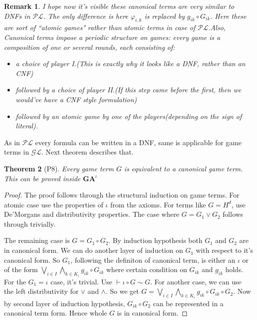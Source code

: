 \documentclass[10pt]{article}
\renewcommand{\phi}{\varphi}
\newcommand{\pl}{\mathcal{PL}}
\newcommand{\gl}{\mathcal{GL}}
\newcommand{\id}{\iota}
\newcommand{\com}[2]{#1 \circ #2 }
\newtheorem{theorem}{Theorem}
\newtheorem{remark}[theorem]{Remark}
\begin{document}
	\begin{remark}
		I hope now it's visible these canonical terms are very similar to DNFs in $\pl$. The only difference is here $\phi_{i,k}$ is replaced by $\com{g_{ik}}{G_{ik}}$. Here these are sort of ``atomic games" rather than atomic terms in case of $\pl$.Also, Canonical terms impose a periodic  structure on games: every game is a composition of one or several rounds, each consisting of:
		\begin{itemize}
			\item a choice of player I.(This is exactly why it looks like a DNF, rather than an CNF)
			\item followed by a choice of player II.(If this step came before the first, then we would've have a CNF style formulation)
			\item followed by an atomic game by one of the players(depending on the sign of literal).
		\end{itemize}
	\end{remark}
	As in $\pl$ every formula can be written in a DNF, same is applicable for game terms in $\gl$. Next theorem describes that.
	\begin{theorem}[P8]\label{th8}
		Every game term $G$ is equivalent to a canonical game term. This can be proved inside $\textbf{GA}^\id$
	\end{theorem}
	\begin{proof}
		The proof follows through the structural induction on game terms. For atomic case use the properties of $\id$ from the axioms. For terms like $G=H^d$, use De'Morgans and distributivity properties. The case where $G = G_1 \lor G_2$ follows through trivially.
		
		The remaining case is $G = \com{G_1}{G_2}$. By induction hypothesis both $G_1$ and $G_2$ are in canonical form. We can do another layer of induction on $G_1$ with respect to it's canonical form. So $G_1$, following the definiton of canonical term, is either an $\id$ or of the form $\bigvee_{i\in I} \bigwedge_{k \in K_i} g_{ik}\circ G_{ik}$ where certain condition on $G_{ik}$ and $g_{ik}$ holds. For the $G_1 = \id$ case, it's trivial. Use $\vdash \com{\id}{G} \sim G $. For another case, we can use the left distributivity for $\lor$ and $\land$. So we get $G = \bigvee_{i\in I} \bigwedge_{k \in K_i} g_{ik}\circ G_{ik} \circ G_2$. Now by second layer of induction hypothesis, $\com{G_{ik}}{G_2}$ can be represented in a canonical term form. Hence whole $G$ is in canonical form.
		\end{proof}
		
\end{document}
